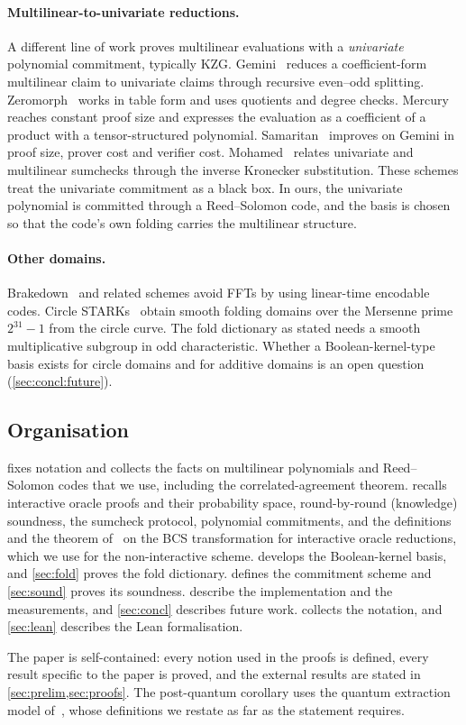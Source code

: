 \paragraph{Multilinear-to-univariate reductions.}
A different line of work proves multilinear evaluations with a \emph{univariate} polynomial commitment, typically KZG.
Gemini~\cite{BCHO22} reduces a coefficient-form multilinear claim to univariate claims through recursive even--odd splitting.
Zeromorph~\cite{KT24} works in table form and uses quotients and degree checks.
Mercury~\cite{EG25} reaches constant proof size and expresses the evaluation as a coefficient of a product with a tensor-structured polynomial. Samaritan~\cite{GPS25} improves on Gemini in proof size, prover cost and verifier cost.
Mohamed~\cite{Moh25} relates univariate and multilinear sumchecks through the inverse Kronecker substitution.
These schemes treat the univariate commitment as a black box.
In ours, the univariate polynomial is committed through a Reed--Solomon code, and the basis is chosen so that the code's own folding carries the multilinear structure.

\paragraph{Other domains.}
Brakedown~\cite{GLSTW23} and related schemes avoid FFTs by using linear-time encodable codes.
Circle STARKs~\cite{HLP24} obtain smooth folding domains over the Mersenne prime $2^{31}-1$ from the circle curve.
The fold dictionary as stated needs a smooth multiplicative subgroup in odd characteristic.
Whether a Boolean-kernel-type basis exists for circle domains and for additive domains is an open question (\cref{sec:concl:future}).

\subsection{Organisation}\label{sec:intro:org}

 fixes notation and collects the facts on multilinear polynomials and Reed--Solomon codes that we use, including the correlated-agreement theorem.
 recalls interactive oracle proofs and their probability space, round-by-round (knowledge) soundness, the sumcheck protocol, polynomial commitments, and the definitions and the theorem of~\cite{CDHZ25} on the BCS transformation for interactive oracle reductions, which we use for the non-interactive scheme.
 develops the Boolean-kernel basis, and \cref{sec:fold} proves the fold dictionary.
 defines the commitment scheme and \cref{sec:sound} proves its soundness.
 describe the implementation and the measurements, and \cref{sec:concl} describes future work.
 collects the notation, and \cref{sec:lean} describes the Lean formalisation.

The paper is self-contained: every notion used in the proofs is defined, every result specific to the paper is proved, and the external results are stated in \cref{sec:prelim,sec:proofs}. The post-quantum corollary uses the quantum extraction model of~\cite{CDHZ25}, whose definitions we restate as far as the statement requires.
